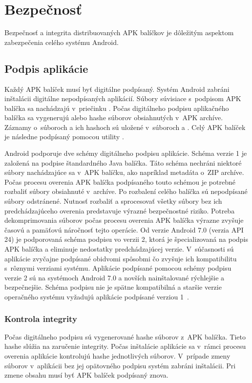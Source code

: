 \section{Bezpečnosť}

Bezpečnosť a integrita distribuovaných APK balíčkov je dôležitým aspektom zabezpečenia celého systému Android.

\subsection{Podpis aplikácie}

Každý APK balíček musí byť digitálne podpísaný. Systém Android zabráni inštalácii digitálne nepodpísaných aplikácií. 
Súbory súvisiace s~podpisom APK balíčka sa nachádzajú v~priečinku . Počas digitálneho podpisu aplikačného balíčka sa vygenerujú  alebo  hashe súborov obsiahnutých v~APK archíve. Záznamy o~súboroch a ich hashoch sú uložené v~súboroch  a . Celý APK balíček je následne podpísaný pomocou utility . 

Android podporuje dve schémy digitálneho podpisu aplikácie. Schéma verzie 1 je založená na podpise štandardného Java balíčka. Táto schéma nechráni niektoré súbory nachádzajúce sa v~APK balíčku, ako napríklad metadáta o~ZIP archíve. Počas procesu overenia APK balíčka podpísaného touto schémou je potrebné rozbaliť súbory obsiahnuté v~archíve. Po rozbalení celého balíčka sú nepodpísané súbory odstránené. Nutnosť rozbaliť a sprocesovať všetky súbory bez ich predchádzajúceho overenia predstavuje výrazné bezpečnostné riziko. Potreba dekomprimovania súborov počas procesu overenia APK balíčka výrazne zvyšuje časovú a pamäťovú náročnosť tejto operácie.  Od verzie Android 7.0 (verzia API 24) je podporovaná schéma podpisu vo verzii 2, ktorá je špecializovaná na podpis APK balíčka a eliminuje nedostatky predchádzajúcej verzie. V~súčasnosti sú aplikácie zvyčajne podpísané obidvomi spôsobmi čo zvyšuje ich kompatibilitu s~rôznymi verziami systému. Aplikácie podpísané pomocou schémy podpisu verzie 2 sú na systémoch Android 7.0 a novších nainštalované rýchlejšie a bezpečnejšie. Schéma podpisu nie je spätne kompatibilná a staršie verzie operačného systému vyžadujú aplikácie podpísané verziou 1~\cite{NT0FrzQIkOAYbG2Ga}.

\subsubsection{\textbf{Kontrola integrity}}
Počas digitálneho podpisu sú vygenerované hashe súborov z~APK balíčka. Tieto hashe slúžia na zaručenie integrity. Počas inštalácie aplikácie sa v~rámci procesu overenia aplikácie kontrolujú hashe jednotlivých súborov. V~prípade zmeny súborov v~aplikácii bez jej opätovného podpisu systém zabráni inštalácii. Pri zmene obsahu musí byť APK balíček podpísaný znova. 

